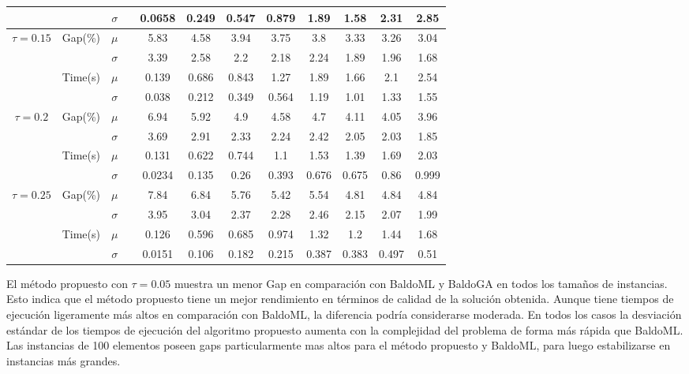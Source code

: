 \documentclass[spanish, a4paper, 12pt, openany,final]{book}
\begin{document}
\begin{table}[H]
\begin{adjustbox}{width=\columnwidth,center}
\begin{tabular}{cccccccccccc}
			& & $\sigma$ & & 0.0658 & 0.249 & 0.547 & 0.879 & 1.89 & 1.58 & 2.31 & 2.85 \\
			\hline		 						        
			\multirow{4}{*}{$\tau=0.15$} & \multirow{2}{*}{Gap(\%)} & $\mu$ & & 5.83 & 4.58 & 3.94 & 3.75 & 3.8 & 3.33 & 3.26 & 3.04 \\
			& & $\sigma$ & & 3.39 & 2.58 & 2.2 & 2.18 & 2.24 & 1.89 & 1.96 & 1.68 \\
			\cline{2-3}
			& \multirow{2}{*}{Time(s)} & $\mu$ & & 0.139 & 0.686 & 0.843 & 1.27 & 1.89 & 1.66 & 2.1 & 2.54 \\
			& & $\sigma$ & & 0.038 & 0.212 & 0.349 & 0.564 & 1.19 & 1.01 & 1.33 & 1.55 \\
			\hline		 						        
			\multirow{4}{*}{$\tau=0.2$} & \multirow{2}{*}{Gap(\%)} & $\mu$ & & 6.94 & 5.92 & 4.9 & 4.58 & 4.7 & 4.11 & 4.05 & 3.96 \\
			& & $\sigma$ & & 3.69 & 2.91 & 2.33 & 2.24 & 2.42 & 2.05 & 2.03 & 1.85 \\
			\cline{2-3}
			& \multirow{2}{*}{Time(s)} & $\mu$ & & 0.131 & 0.622 & 0.744 & 1.1 & 1.53 & 1.39 & 1.69 & 2.03 \\
			& & $\sigma$ & & 0.0234 & 0.135 & 0.26 & 0.393 & 0.676 & 0.675 & 0.86 & 0.999 \\
			\hline		 						        
			\multirow{4}{*}{$\tau=0.25$} & \multirow{2}{*}{Gap(\%)} & $\mu$ & & 7.84 & 6.84 & 5.76 & 5.42 & 5.54 & 4.81 & 4.84 & 4.84 \\
			& & $\sigma$ & & 3.95 & 3.04 & 2.37 & 2.28 & 2.46 & 2.15 & 2.07 & 1.99 \\
			\cline{2-3}
			& \multirow{2}{*}{Time(s)} & $\mu$ & & 0.126 & 0.596 & 0.685 & 0.974 & 1.32 & 1.2 & 1.44 & 1.68 \\
			& & $\sigma$ & & 0.0151 & 0.106 & 0.182 & 0.215 & 0.387 & 0.383 & 0.497 & 0.51 \\
		\end{tabular}
	\end{adjustbox}
\end{table}

El método propuesto con $\tau = 0.05$ muestra un menor Gap en comparación con BaldoML y BaldoGA en todos los tamaños de instancias. Esto indica que el método propuesto tiene un mejor rendimiento en términos de calidad de la solución obtenida. Aunque tiene tiempos de ejecución ligeramente más altos en comparación con BaldoML, la diferencia podría considerarse moderada. En todos los casos la desviación estándar de los tiempos de ejecución del algoritmo propuesto aumenta con la complejidad del problema de forma más rápida que BaldoML. Las instancias de 100 elementos poseen gaps particularmente mas altos para el método propuesto y BaldoML, para luego estabilizarse en instancias más grandes.
\end{document}
